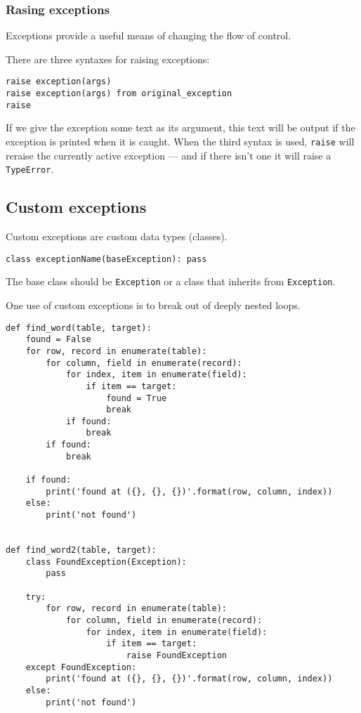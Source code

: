 \subsubsection{Rasing exceptions}

Exceptions provide a useful means of changing the flow of control.

There are three syntaxes for raising exceptions:
\begin{tcolorbox}

\begin{verbatim}
raise exception(args)
raise exception(args) from original_exception
raise
\end{verbatim}
  
\end{tcolorbox}

If we give the exception some text as its argument, this text will be output if the exception is printed when it is caught.
When the third syntax is used, \verb|raise| will reraise the currently active exception --- and if there isn't one it will raise a \verb|TypeError|.


\subsection{Custom exceptions}

Custom exceptions are custom data types (classes).
\begin{tcolorbox}
\begin{verbatim}
class exceptionName(baseException): pass
\end{verbatim}
  
\end{tcolorbox}

The base class should be \verb|Exception| or a class that inherits from \verb|Exception|.



One use of custom exceptions is to break out of deeply nested loops.

\begin{lstlisting}
def find_word(table, target):
    found = False
    for row, record in enumerate(table):
        for column, field in enumerate(record):
            for index, item in enumerate(field):
                if item == target:
                    found = True
                    break
            if found:
                break
        if found:
            break

    if found:
        print('found at ({}, {}, {})'.format(row, column, index))
    else:
        print('not found')


def find_word2(table, target):
    class FoundException(Exception):
        pass

    try:
        for row, record in enumerate(table):
            for column, field in enumerate(record):
                for index, item in enumerate(field):
                    if item == target:
                        raise FoundException
    except FoundException:
        print('found at ({}, {}, {})'.format(row, column, index))
    else:
        print('not found')  
\end{lstlisting}


